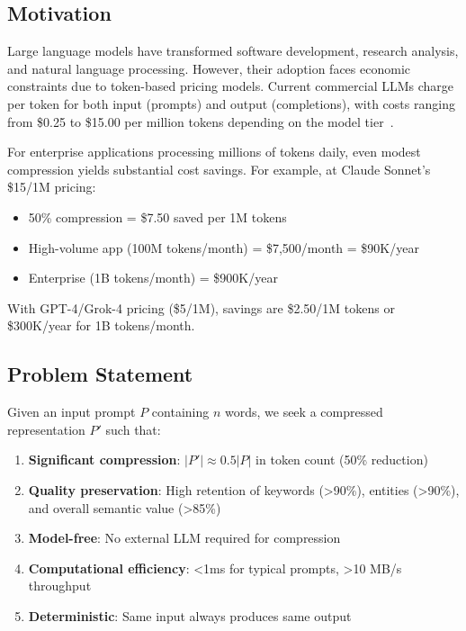 \subsection{Motivation}

Large language models have transformed software development, research analysis, and natural language processing. However, their adoption faces economic constraints due to token-based pricing models. Current commercial LLMs charge per token for both input (prompts) and output (completions), with costs ranging from \$0.25 to \$15.00 per million tokens depending on the model tier~\cite{anthropic2024pricing,openai2024pricing}.

For enterprise applications processing millions of tokens daily, even modest compression yields substantial cost savings. For example, at Claude Sonnet's \$15/1M pricing:

\begin{itemize}
    \item 50\% compression = \$7.50 saved per 1M tokens
    \item High-volume app (100M tokens/month) = \$7,500/month = \$90K/year
    \item Enterprise (1B tokens/month) = \$900K/year
\end{itemize}

With GPT-4/Grok-4 pricing (\$5/1M), savings are \$2.50/1M tokens or \$300K/year for 1B tokens/month.

\subsection{Problem Statement}

Given an input prompt $P$ containing $n$ words, we seek a compressed representation $P'$ such that:

\begin{enumerate}
    \item \textbf{Significant compression}: $|P'| \approx 0.5|P|$ in token count (50\% reduction)
    \item \textbf{Quality preservation}: High retention of keywords (>90\%), entities (>90\%), and overall semantic value (>85\%)
    \item \textbf{Model-free}: No external LLM required for compression
    \item \textbf{Computational efficiency}: <1ms for typical prompts, >10 MB/s throughput
    \item \textbf{Deterministic}: Same input always produces same output
\end{enumerate}

